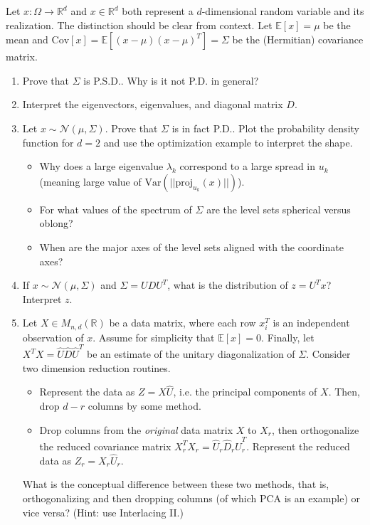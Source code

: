 \documentclass[11pt]{article}
\newcommand{\R}{\ensuremath{\mathbb R}}
\newcommand{\EV}{\ensuremath{\mathbb E}}
\theoremstyle{plain}
\theoremstyle{definition}
\theoremstyle{remark}
\begin{document}
Let $x: \Omega \rightarrow \R^d$ and $x \in \R^d$ both represent a $d$-dimensional random variable and its realization. The distinction should be clear from context. Let $\EV[x] = \mu$ be the mean and $\text{Cov}[x] = \EV[(x - \mu)(x - \mu)^T] = \Sigma$ be the (Hermitian) covariance matrix.
\begin{enumerate}
    \item Prove that $\Sigma$ is P.S.D.. Why is it not P.D. in general?
    \item Interpret the eigenvectors, eigenvalues, and diagonal matrix $D$.
    \item Let $x \sim \mathcal{N}(\mu, \Sigma)$. Prove that $\Sigma$ is in fact P.D.. Plot the probability density function for $d = 2$ and use the optimization example to interpret the shape.
    \begin{itemize}
        \item Why does a large eigenvalue $\lambda_k$ correspond to a large spread in $u_k$ (meaning large value of $\text{Var}(||\text{proj}_{u_k}(x)||)$). 
        \item For what values of the spectrum of $\Sigma$ are the level sets spherical versus oblong?
        \item When are the major axes of the level sets aligned with the coordinate axes?
    \end{itemize}
    \item If $x \sim \mathcal{N}(\mu, \Sigma)$ and $\Sigma = UDU^T$, what is the distribution of $z = U^T x$? Interpret $z$.
    \item Let $X \in M_{n, d}(\R)$ be a data matrix, where each row $x^T_i$ is an independent observation of $x$. Assume for simplicity that $\EV[x] = 0$. Finally, let $X^T X = \hat{U} \hat{D}\hat{U}^T$ be an estimate of the unitary diagonalization of $\Sigma$. Consider two dimension reduction routines.
    \begin{itemize}
        \item Represent the data as $Z = X\hat{U}$, i.e. the principal components of $X$. Then, drop $d - r$ columns by some method.
        \item Drop columns from the {\it original} data matrix $X$ to $X_r$, then orthogonalize the reduced covariance matrix $X_r^T X_r = \hat{U}_r \hat{D}_r\hat{U}^T_r$. Represent the reduced data as $Z_r = X_r \hat{U}_r$.
    \end{itemize}
    What is the conceptual difference between these two methods, that is, orthogonalizing and then dropping columns (of which PCA is an example) or vice versa? (Hint: use Interlacing II.)
\end{enumerate}
\end{document}
